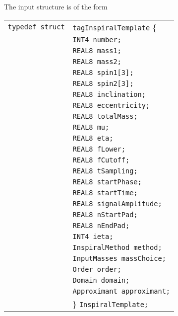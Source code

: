 \documentclass[12pt]{article}
\begin{document}
\vspace{5mm}


\clearpage
The input structure is of the form

\vspace{5mm}

\begin{tabular}{ll}
\texttt{typedef struct} & \texttt{tagInspiralTemplate} \{ \\
                        & \texttt{INT4 number;} \\
                        & \texttt{REAL8 mass1;} \\
                        & \texttt{REAL8 mass2;}  \\
                        & \texttt{REAL8 spin1[3];}  \\
                        & \texttt{REAL8 spin2[3];}  \\
                        & \texttt{REAL8 inclination;} \\
                        & \texttt{REAL8 eccentricity;} \\
                        & \texttt{REAL8 totalMass;} \\
                        & \texttt{REAL8 mu;}  \\
                        & \texttt{REAL8 eta;}  \\
                        & \texttt{REAL8 fLower;}  \\
                        & \texttt{REAL8 fCutoff;} \\
                        & \texttt{REAL8 tSampling;} \\
                        & \texttt{REAL8 startPhase;} \\
                        & \texttt{REAL8 startTime;} \\
                        & \texttt{REAL8 signalAmplitude;} \\
                        & \texttt{REAL8 nStartPad;} \\
                        & \texttt{REAL8 nEndPad;} \\
                        & \texttt{INT4 ieta;} \\
                        & \texttt{InspiralMethod method;}  \\
                        & \texttt{InputMasses massChoice;}  \\
                        & \texttt{Order order;}  \\
                        & \texttt{Domain domain;}  \\
                        & \texttt{Approximant approximant;}  \\
                        & \} \texttt{InspiralTemplate;}
\end{tabular}
\end{document}
